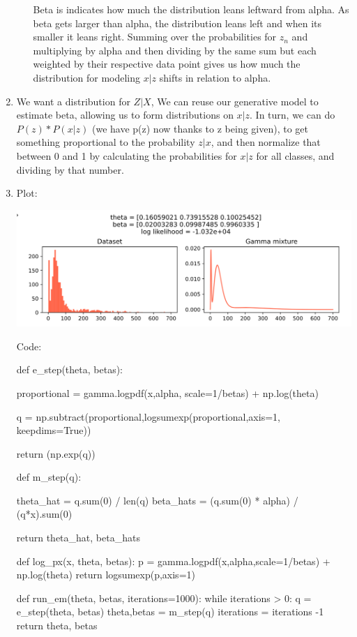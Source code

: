 \documentclass[submit]{harvardml}
\begin{document}
\begin{enumerate}
\begin{enumerate}
      Beta is indicates how much the distribution leans leftward from alpha. As beta gets larger than alpha, the distribution leans left and when its smaller it leans right. Summing over the probabilities for $z_n$ and multiplying by alpha and then dividing by the same sum but each weighted by their respective data point gives us how much the distribution for modeling $x|z$ shifts in relation to alpha. 
      
      
    \end{enumerate}
  \item 
  We want a distribution for $Z|X$, We can reuse our generative model to estimate beta, allowing us to form distributions on $x|z$. In turn, we can do $P(z) * P(x|z)$ (we have p(z) now thanks to z being given), to get something proportional to the probability $z|x$, and then normalize that between 0 and 1 by calculating the probabilities for $x|z$ for all classes, and dividing by that number.
  \item 
    Plot:

    \includegraphics[width=\linewidth]{HW5/Screenshot (162).png}

    Code:

    \begin{python}
def e_step(theta, betas):
    
    proportional = gamma.logpdf(x,alpha, scale=1/betas) + np.log(theta)
 
        
    q = np.subtract(proportional,logsumexp(proportional,axis=1, keepdims=True))


    return (np.exp(q))


def m_step(q):

    
    theta_hat = q.sum(0) / len(q)
    beta_hats = (q.sum(0) * alpha) / (q*x).sum(0)
    
    return theta_hat, beta_hats


def log_px(x, theta, betas):
    p = gamma.logpdf(x,alpha,scale=1/betas) + np.log(theta)
    return logsumexp(p,axis=1)


def run_em(theta, betas, iterations=1000):
    while iterations > 0:
      q = e_step(theta, betas)
      theta,betas = m_step(q)
      iterations = iterations -1 
    return theta, betas
    \end{python}
\end{enumerate}
\end{document}
